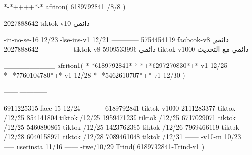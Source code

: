 *-*++++*-*
afriton(
6189792841 /8/8
)

2027888642 tiktok-v10
دائمي

-in-no-se-16 12/23
-lse-ins-v1 12/21
------------
5754454119 facbook-v8
دائمي
--------------
2027888642 tiktok-v8
دائمي
5909533996 tiktok-v1000
دائمي مع التحديث

__________
afriton1(
*-*6189792841*-*
*+*6297270830*+*-v1 12/25
*+*7760104780*+*-v1 12/28
*+*5462610707*+*-v1 12/30
)

------
------------

6911225315-face-15 12/24
---------
6189792841 tiktok-v1000
2111283377 tiktok /12/25
854141804 tiktok /12/25
1959471239 tiktok /12/25
6717029071 tiktok /12/25
5460890865 tiktok /12/25
1423762395 tiktok /12/26
7969466119 tiktok /12/28
6040158971 tiktok /12/28
7089461048 tiktok /12/31
------
-v10-m 10/23
-----
userinsta 11/16
------
-twe/10/29
Trind(
6189792841-Trind-v1 
)
